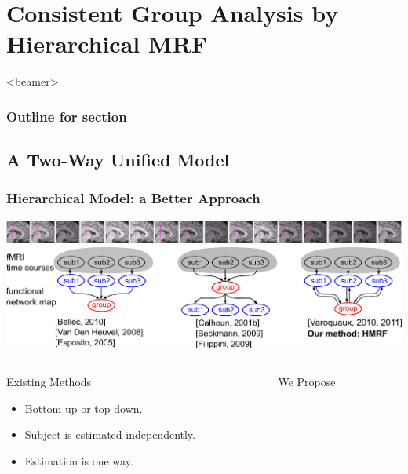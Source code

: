 \documentclass[sansserif, 10pt]{beamer}
\begin{document}
\section{Consistent Group Analysis by Hierarchical MRF}

\begin{frame}<beamer>
  \frametitle{Outline for section \thesection}
  \tableofcontents[currentsection, sectionstyle=show/hide, subsectionstyle=show/show/hide]

\end{frame}

\subsection{A Two-Way Unified Model}
\begin{frame}
  \frametitle{ Hierarchical Model: a Better Approach}
  \includegraphics[width=\textwidth]{sfig/allsubs} \\
  \vspace{3pt}
  \includegraphics[width=\textwidth]{sfig/bidirections}\\
  \vspace{3pt}
  \begin{columns}
    \begin{column}{0.4\textwidth}
      \begin{block}{Existing Methods}
        \begin{itemize}
        \item Bottom-up or top-down. 
        \item Subject is estimated independently. 
        \item Estimation is one way. 
        \end{itemize}
      \end{block}
    \end{column}
  
    \begin{column}{0.6\textwidth}
      \begin{block}{We Propose}
        \begin{itemize}


\end{itemize}
\end{block}
\end{column}
\end{columns}
\end{frame}
\end{document}
